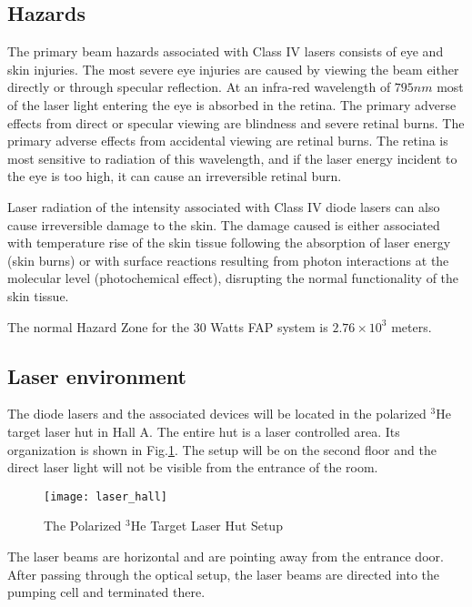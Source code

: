 \subsection{Hazards}

The primary beam hazards associated with Class IV lasers consists of eye and skin
injuries. The most severe eye injuries are caused by viewing the beam either directly
or through specular reflection. At an infra-red wavelength of $795 nm$ most of the
laser light entering the eye is absorbed in the retina. The primary adverse effects
from direct or specular viewing are blindness and severe retinal burns. The primary
adverse effects from accidental viewing are retinal burns. The retina is most
sensitive to radiation of this wavelength, and if the laser energy incident to the eye
is too high, it can cause an irreversible retinal burn.

Laser radiation of the intensity associated with Class IV diode lasers can also
cause irreversible damage to the skin. The damage caused is either associated with
temperature rise of the skin tissue following the absorption of laser energy (skin
burns) or with surface reactions resulting from photon interactions at the molecular
level (photochemical effect), disrupting the normal functionality of the skin tissue.

The normal Hazard Zone for the 30 Watts FAP system is $2.76 \times 10^3$ meters.


\subsection{Laser environment}

The diode lasers and the associated devices will be located in the polarized $^3$He target laser hut in Hall A.
The entire hut is a laser controlled area. Its organization is shown in
Fig.\ref{fig:laser_hall}. The setup will be on the second floor and the direct laser light
will not be visible from the entrance of the room.


\begin{figure}
  \centerline{\texttt{[image: laser\_hall]}}
  \caption[Polarized $^3$He Laser Hut]{The Polarized $^3$He Target Laser Hut Setup}
   \label{fig:laser_hall} 
\end{figure}

The laser beams are horizontal and are pointing away from the entrance door. 
After passing through the optical setup, the laser beams 
are directed into the pumping cell and terminated there. 

